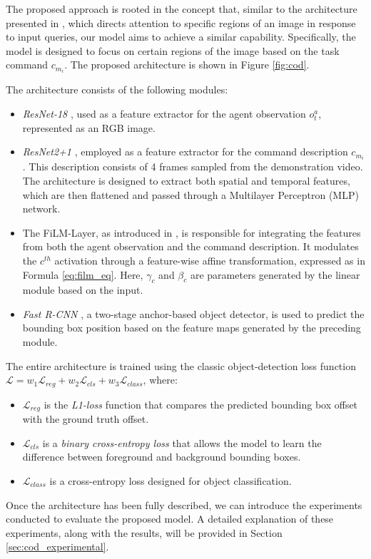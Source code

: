 The proposed approach is rooted in the concept that, similar to the architecture presented in \cite{perez2018film}, which directs attention to specific regions of an image in response to input queries, our model aims to achieve a similar capability. Specifically, the model is designed to focus on certain regions of the image based on the task command $c_{m_{i}}$. The proposed architecture is shown in Figure \ref{fig:cod}.


The architecture consists of the following modules:
\begin{itemize}
    \item \textit{ResNet-18} \cite{resnet}, used as a feature extractor for the agent observation $o^{a}_{t}$, represented as an RGB image.
    \item \textit{ResNet2+1} \cite{resnet21}, employed as a feature extractor for the command description $c_{m_{i}}$. This description consists of 4 frames sampled from the demonstration video. The architecture is designed to extract both spatial and temporal features, which are then flattened and passed through a Multilayer Perceptron (MLP) network.
    \item The FiLM-Layer, as introduced in \cite{perez2018film}, is responsible for integrating the features from both the agent observation and the command description. It modulates the $c^{th}$ activation through a feature-wise affine transformation, expressed as in Formula \ref{eq:film_eq}. Here, $\gamma_{c}$ and $\beta_{c}$ are parameters generated by the linear module based on the input.
    \item \textit{Fast R-CNN} \cite{fastrcnn}, a two-stage anchor-based object detector, is used to predict the bounding box position based on the feature maps generated by the preceding module.
\end{itemize}

The entire architecture is trained using the classic object-detection loss function $\mathcal{L} = w_{1}\mathcal{L}_{reg} + w_{2}\mathcal{L}_{cls} + w_{3}\mathcal{L}_{class}$, where:
\begin{itemize}
    \item $\mathcal{L}_{reg}$ is the \textit{L1-loss} function that compares the predicted bounding box offset with the ground truth offset.
    \item $\mathcal{L}_{cls}$ is a \textit{binary cross-entropy loss} that allows the model to learn the difference between foreground and background bounding boxes.
    \item $\mathcal{L}_{class}$ is a cross-entropy loss designed for object classification.
\end{itemize}

Once the architecture has been fully described, we can introduce the experiments conducted to evaluate the proposed model. A detailed explanation of these experiments, along with the results, will be provided in Section \ref{sec:cod_experimental}.
